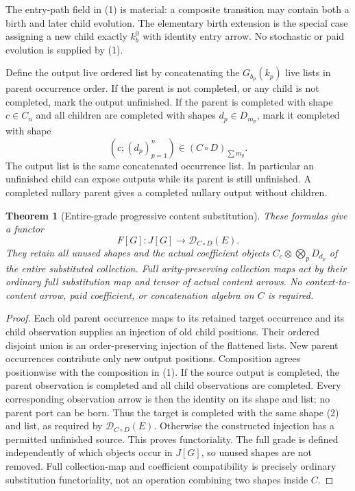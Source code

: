 \documentclass[11pt]{article}
\newtheorem{theorem}{Theorem}\newtheorem{proposition}{Proposition}
\begin{document}
The entry-path field in (1) is material: a composite transition may contain both a birth and later child evolution. The elementary birth extension is the special case assigning a new child exactly $k_b^0$ with identity entry arrow. No stochastic or paid evolution is supplied by (1).

Define the output live ordered list by concatenating the $G_{b_p}(k_p)$ live lists in parent occurrence order. If the parent is not completed, or any child is not completed, mark the output unfinished. If the parent is completed with shape $c\in C_n$ and all children are completed with shapes $d_p\in D_{m_p}$, mark it completed with shape
\[
               (c;(d_p)_{p=1}^n)\in(C\circ D)_{\sum m_p}. \tag{2}
\]
The output list is the same concatenated occurrence list. In particular an unfinished child can expose outputs while its parent is still unfinished. A completed nullary parent gives a completed nullary output without children.

\begin{theorem}[Entire-grade progressive content substitution]
These formulas give a functor
\[
             F[G]:J[G]\longrightarrow\mathcal D_{C\circ D}(E).
\]
They retain all unused shapes and the actual coefficient objects
$C_c\otimes\bigotimes_pD_{d_p}$ of the entire substituted collection. Full arity-preserving collection maps act by their ordinary full substitution map and tensor of actual content arrows. No context-to-content arrow, paid coefficient, or concatenation algebra on $C$ is required.
\end{theorem}
\begin{proof}
Each old parent occurrence maps to its retained target occurrence and its child observation supplies an injection of old child positions. Their ordered disjoint union is an order-preserving injection of the flattened lists. New parent occurrences contribute only new output positions. Composition agrees positionwise with the composition in (1). If the source output is completed, the parent observation is completed and all child observations are completed. Every corresponding observation arrow is then the identity on its shape and list; no parent port can be born. Thus the target is completed with the same shape (2) and list, as required by $\mathcal D_{C\circ D}(E)$. Otherwise the constructed injection has a permitted unfinished source. This proves functoriality. The full grade is defined independently of which objects occur in $J[G]$, so unused shapes are not removed. Full collection-map and coefficient compatibility is precisely ordinary substitution functoriality, not an operation combining two shapes inside $C$.\end{proof}
\end{document}
